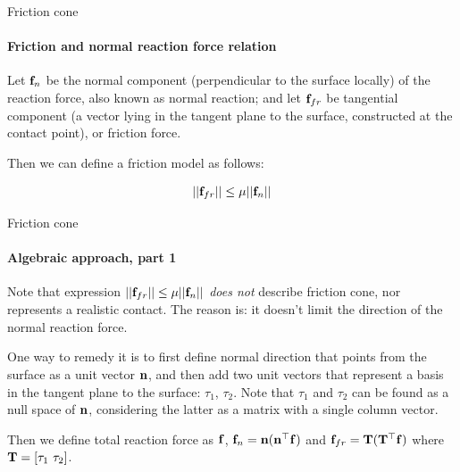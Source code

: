 \documentclass{beamer}
\begin{document}
\begin{frame}{Friction cone}
\framesubtitle{Friction and normal reaction force relation}
\begin{flushleft}

\begin{figure}
    \centering
    
    \label{fig:contact}
\end{figure}

Let $\mathbf{f}_n$ be the normal component (perpendicular to the surface locally) of the reaction force, also known as normal reaction; and let $\mathbf{f}_{fr}$ be tangential component (a vector lying in the tangent plane to the surface, constructed at the contact point), or friction force.

\bigskip

Then we can define a friction model as follows:

\begin{equation}
    ||\mathbf{f}_{fr}|| \leq \mu ||\mathbf{f}_n||
\end{equation}

\end{flushleft}
\end{frame}




\begin{frame}{Friction cone}
\framesubtitle{Algebraic approach, part 1}
\begin{flushleft}

Note that expression $||\mathbf{f}_{fr}|| \leq \mu ||\mathbf{f}_n||$ \emph{does not} describe friction cone, nor represents a realistic contact. The reason is: it doesn't limit the direction of the normal reaction force.

\bigskip

One way to remedy it is to first define normal direction that points from the surface as a unit vector $\mathbf{n}$, and then add two unit vectors that represent a basis in the tangent plane to the surface: $\tau_1$, $\tau_2$. Note that $\tau_1$ and $\tau_2$ can be found as a null space of $\mathbf{n}$, considering the latter as a matrix with a single column vector.

\bigskip

Then we define total reaction force as $\mathbf{f}$, $\mathbf{f}_n = \mathbf{n}(\mathbf{n}^\top \mathbf{f})$ and $\mathbf{f}_{fr} = \mathbf{T}(\mathbf{T}^\top \mathbf{f})$ where $\mathbf{T} = [\tau_1 \ \tau_2]$.

\end{flushleft}
\end{frame}
\end{document}

